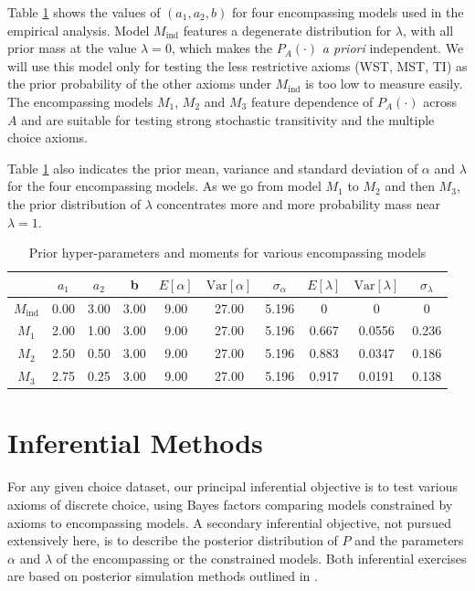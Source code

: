 \documentclass[11pt,letter]{article}
\begin{document}
Table \ref{t:hyper} shows the values of $(a_1, a_2, b)$ for four encompassing models used in the empirical analysis.
Model $M_{\mathrm{ind}}$ features a degenerate distribution for $\lambda$, with all prior mass at the value $\lambda = 0$, which makes the $P_A(\cdot)$ {\em a priori} independent.
We will use this model only for testing the less restrictive axioms (WST, MST, TI) as the prior probability of the other axioms under $M_{\mathrm{ind}}$ is too low to measure easily.
The encompassing models $M_1$, $M_2$ and $M_3$ feature dependence of $P_A(\cdot)$ across $A$ and are suitable for testing strong stochastic transitivity and the multiple choice axioms.

Table \ref{t:hyper} also indicates the prior mean, variance and standard deviation of $\alpha$ and $\lambda$ for the four encompassing models.
As we go from model $M_1$ to $M_2$ and then $M_3$, the prior distribution of $\lambda$ concentrates more and more probability mass near $\lambda = 1$.

\begin{table}
  \centering
  \begin{tabular}{cccccccccc}
    & $a_1$ & $a_2$ & b &
    $E[\alpha]$ & $\mathrm{Var}[\alpha]$ & $\sigma_\alpha$ & $E[\lambda]$ & $\mathrm{Var}[\lambda]$ & $\sigma_\lambda$ \\
    \hline
    $M_{\mathrm{ind}}$ & 0.00 & 3.00 & 3.00 & 9.00 & 27.00 & 5.196 & 0 & 0 & 0 \\
    \hline
    $M_1$ & 2.00 & 1.00 & 3.00 & 9.00 & 27.00 & 5.196 & 0.667 & 0.0556 & 0.236 \\
    $M_2$ & 2.50 & 0.50 & 3.00 & 9.00 & 27.00 & 5.196 & 0.883 & 0.0347 & 0.186 \\
    $M_3$ & 2.75 & 0.25 & 3.00 & 9.00 & 27.00 & 5.196 & 0.917 & 0.0191 & 0.138 \\
    \hline
  \end{tabular}\caption{Prior hyper-parameters and moments for various encompassing models}\label{t:hyper}
\end{table}

\section{Inferential Methods}\label{s:inference}

For any given choice dataset, our principal inferential objective is to test various axioms of discrete choice, using Bayes factors comparing models constrained by axioms to encompassing models.
A secondary inferential objective, not pursued extensively here, is to describe the posterior distribution of $P$ and the parameters $\alpha$ and $\lambda$ of the encompassing or the constrained models.
Both inferential exercises are based on posterior simulation methods outlined in .
\end{document}
